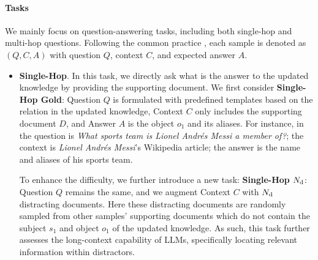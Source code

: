 \documentclass[11pt]{article}
\newcommand{\mscript}[1]{\text{\scriptsize{#1}}}
\begin{document}
        \paragraph{Tasks}
            We mainly focus on question-answering tasks, including both single-hop and multi-hop questions.
            Following the common practice \cite{yang2018hotpotqa,kovcisky2018narrativeqa,bai2024longbench},
            each sample is denoted as $(Q, C, A)$ with question $Q$, context $C$, and expected answer $A$.
            \begin{itemize}[leftmargin=*, itemsep=2pt]
                \item
                    \textbf{Single-Hop}.
                    In this task, we directly ask what is the answer to the updated knowledge by providing the supporting document.
                    We first consider \textbf{Single-Hop Gold}:
                    Question $Q$ is formulated with predefined templates based on the relation in the updated knowledge,
                    Context $C$ only includes the supporting document $D$, and Answer $A$ is the object $o_{1}$ and its aliases.
                    For instance,
                    in  the question is \textit{What sports team is Lionel Andrés Messi a member of?};
                    the context is \textit{Lionel Andrés Messi}'s Wikipedia article; the answer is the name and aliases of his sports team.

                    To enhance the difficulty, we further introduce a new task: \textbf{Single-Hop} $N_{\mscript{d}}$:
                    Question $Q$ remains the same, and we augment Context $C$ with $N_{\mscript{d}}$ distracting documents.
                    Here these distracting documents are randomly sampled from other samples' supporting documents which do not contain the subject $s_{1}$ and object $o_{1}$ of the updated knowledge.
                    As such, this task further assesses the long-context capability of LLMs,
                    specifically locating relevant information within distractors.




\end{itemize}
\end{document}
